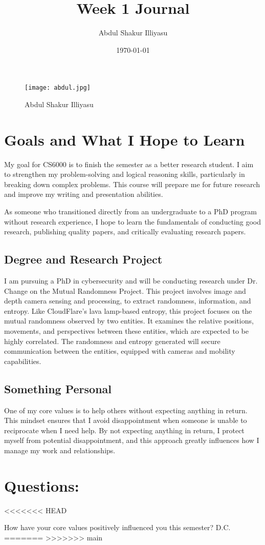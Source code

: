 \documentclass{article}
\title{Week 1 Journal}
\author{Abdul Shakur Illiyasu}
\date{\today}
\begin{document}
\maketitle

\begin{figure}[ht]
    \centering
    \texttt{[image: abdul.jpg]}
    \caption{Abdul Shakur Illiyasu}
    \label{fig: picture.jpg}
\end{figure}

\section{Goals and What I Hope to Learn}

My goal for CS6000 is to finish the semester as a better research student. I aim to strengthen my problem-solving and logical reasoning skills, particularly in breaking down complex problems. This course will prepare me for future research and improve my writing and presentation abilities.

As someone who transitioned directly from an undergraduate to a PhD program without research experience, I hope to learn the fundamentals of conducting good research, publishing quality papers, and critically evaluating research papers.

\subsection{Degree and Research Project}
I am pursuing a PhD in cybersecurity and will be conducting research under Dr. Change on the Mutual Randomness Project. This project involves image and depth camera sensing and processing, to extract randomness, information, and entropy. Like CloudFlare’s lava lamp-based entropy, this project focuses on the mutual randomness observed by two entities. It examines the relative positions, movements, and perspectives between these entities, which are expected to be highly correlated. The randomness and entropy generated will secure communication between the entities, equipped with cameras and mobility capabilities.

\subsection {Something Personal}
One of my core values is to help others without expecting anything in return. This mindset ensures that I avoid disappointment when someone is unable to reciprocate when I need help. By not expecting anything in return, I protect myself from potential disappointment, and this approach greatly influences how I manage my work and relationships.




\section*{Questions: }
<<<<<<< HEAD

How have your core values positively influenced you this semester? D.C.
=======
>>>>>>> main
\end{document}
